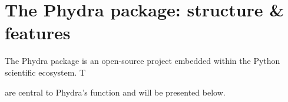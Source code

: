 \documentclass[template.tex]{subfiles}
\begin{document}

\section{The Phydra package: structure \& features} \label{Section:phydrapackage}




The Phydra package is an open-source project embedded within the Python scientific ecosystem. T  

are central to Phydra's function and will be presented below.
\end{document}
